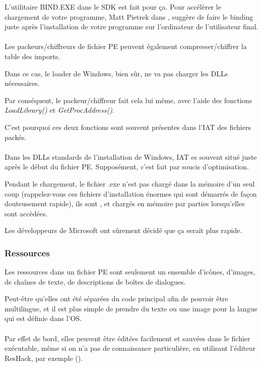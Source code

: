 L'utilitaire BIND.EXE dans le SDK est fait pour ça.
Pour accélèrer le chargement de votre programme, Matt Pietrek dans \PietrekPEURL,
suggère de faire le binding juste après l'installation de votre programme sur l'ordinateur
de l'utilisateur final. \\
\\
Les packeurs/chiffreurs de fichier PE peuvent également compresser/chiffrer la table
des imports.

Dans ce cas, le loader de Windows, bien sûr, ne va pas charger les DLLs nécessaires.

Par conséquent, le packeur/chiffreur fait cela lui même, avec l'aide des fonctions
\emph{LoadLibrary()} et \emph{GetProcAddress()}.

C'est pourquoi ces deux fonctions sont souvent présentes dans l'\ac{IAT} des fichiers
packés.\\
\\
Dans les DLLs standards de l'installation de Windows, \ac{IAT} es souvent situé juste
après le début du fichier PE.
Supposément, c'est fait par soucis d'optimisation.

Pendant le chargement, le fichier .exe n'est pas chargé dans la mémoire d'un seul
coup (rappelez-vous ces fichiers d'installation énormes qui sont démarrés de façon
douteusement rapide), ils sont , et chargés en mémoire par parties lorsqu'elles
sont accèdées.

Les développeurs de Microsoft ont sûrement décidé que ça serait plus rapide.

\subsubsection{Ressources}

\label{PEresources}

Les ressources dans un fichier PE sont seulement un ensemble d'icônes, d'images,
de chaînes de texte, de descriptions de boîtes de dialogues.

Peut-être qu'elles ont été séparées du code principal afin de pouvoir être multilingue,
et il est plus simple de prendre du texte ou une image pour la langue qui est définie
dans l'\ac{OS}. \\
\\
Par effet de bord, elles peuvent être éditées facilement et sauvées dans le fichier
exécutable, même si on n'a pas de connaissance particulière, en utilisant l'éditeur
ResHack, par exemple ().

